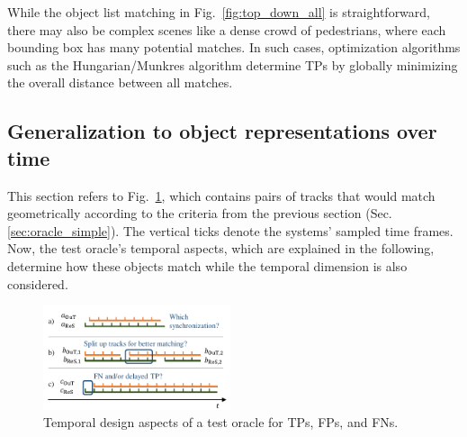 \documentclass[conference]{IEEEtran}
\begin{document}
While the object list matching in Fig.~\ref{fig:top_down_all} is straightforward, there may also be complex scenes like a dense crowd of pedestrians, where each bounding box has many potential matches. %
In such cases, optimization algorithms such as the Hungarian/Munkres algorithm determine TPs by globally minimizing the overall distance between all matches.


\subsection{Generalization to object representations over time}
\label{sec:oracle_time}


This section refers to Fig.~\ref{fig:timeline}, which contains pairs of tracks that would match geometrically according to the criteria from the previous section (Sec. \ref{sec:oracle_simple}). 
The vertical ticks denote the systems' sampled time frames.
Now, the test oracle's temporal aspects, which are explained in the following, determine how these objects match while the temporal dimension is also considered.



\begin{figure}[t]
	\centering
	\vspace*{2mm}
	\includegraphics[width=0.49\textwidth]{img/timeline.pdf}
	\caption{Temporal design aspects of a test oracle for TPs, FPs, and FNs.
	}
	\label{fig:timeline}
\end{figure}
\end{document}
